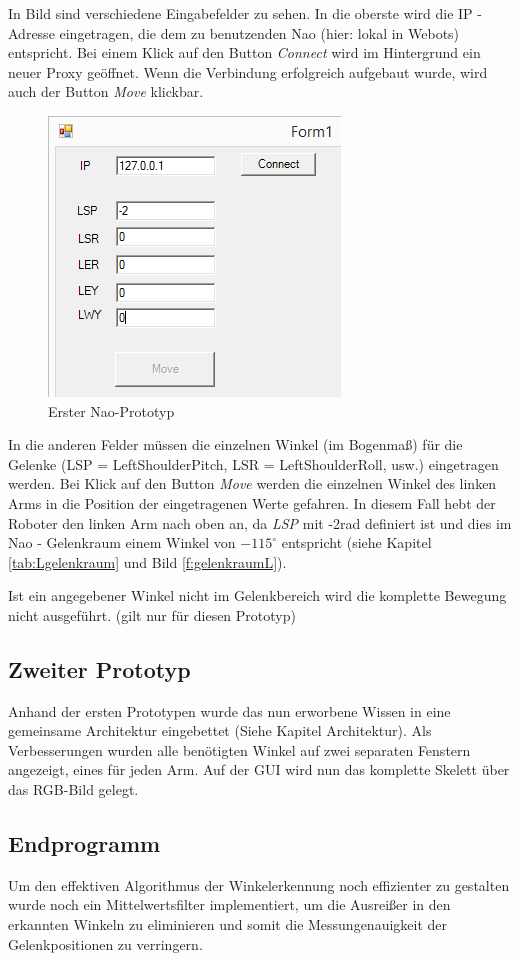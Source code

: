 In Bild  sind verschiedene Eingabefelder zu sehen. In die oberste wird die IP - Adresse eingetragen, die dem zu benutzenden Nao (hier: lokal in Webots) entspricht. Bei einem Klick auf den Button \textit{Connect} wird im Hintergrund ein neuer Proxy geöffnet. Wenn die Verbindung erfolgreich aufgebaut wurde, wird auch der Button \textit{Move} klickbar.
\begin{figure}[H]						
	\centering							
	\includegraphics[scale=0.8]{Bilder/nao_prototyp1.PNG}
	\caption{Erster Nao-Prototyp}						
	\label{f:nao_prototyp1}						
\end{figure}
In die anderen Felder müssen die einzelnen Winkel (im Bogenmaß) für die Gelenke (LSP = LeftShoulderPitch, LSR = LeftShoulderRoll, usw.) eingetragen werden. Bei Klick auf den Button \textit{Move} werden die einzelnen Winkel des linken Arms in die Position der eingetragenen Werte gefahren. In diesem Fall hebt der Roboter den linken Arm nach oben an, da \textit{LSP} mit -2rad definiert ist und dies im Nao - Gelenkraum einem Winkel von $-115^{\circ}$ entspricht (siehe Kapitel \ref{tab:Lgelenkraum} und Bild \ref{f:gelenkraumL}). 

Ist ein angegebener Winkel nicht im Gelenkbereich wird die komplette Bewegung nicht ausgeführt. (gilt nur für diesen Prototyp)

\subsection{Zweiter Prototyp}
Anhand der ersten Prototypen wurde das nun erworbene Wissen in eine gemeinsame Architektur eingebettet (Siehe Kapitel Architektur). Als Verbesserungen wurden alle benötigten Winkel auf zwei separaten Fenstern angezeigt, eines für jeden Arm. Auf der GUI wird nun das komplette Skelett über das RGB-Bild gelegt.


\subsection{Endprogramm}
Um den effektiven Algorithmus der Winkelerkennung noch effizienter zu gestalten wurde noch ein Mittelwertsfilter implementiert, um die Ausreißer in den erkannten Winkeln zu eliminieren und somit die Messungenauigkeit der Gelenkpositionen zu verringern.



